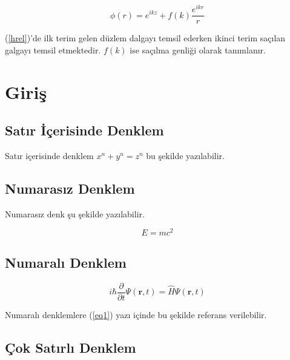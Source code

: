\documentclass[12pt, a4paper]{article}
\begin{document}
\begin{equation} \label{hrel}
\phi(r)=e^{ikz}+f(k)\frac{e^{ikr}}{r}
\end{equation}

(\ref{hrel})'de ilk terim gelen düzlem dalgayı temsil ederken ikinci terim saçılan galgayı temsil etmektedir. $f(k)$ ise saçılma genliği olarak tanımlanır.





\newpage
\section{Giriş}

\subsection{Satır İçerisinde Denklem}

\hspace{1cm}Satır içerisinde denklem \( x^n + y^n = z^n \) bu şekilde yazılabilir.

\subsection{Numarasız Denklem}

\hspace{1cm}Numarasız denk şu şekilde yazılabilir.

\begin{equation*}
E=mc^2 
\end{equation*}

\subsection{Numaralı Denklem}

\begin{equation} \label{eq1}
i\hbar \frac{\partial}{\partial t}\Psi(\mathbf{r},t) = \hat H \Psi(\mathbf{r},t)
\end{equation}

Numaralı denklemlere (\ref{eq1}) yazı içinde bu şekilde referans verilebilir.

\subsection{Çok Satırlı Denklem}
\end{document}
